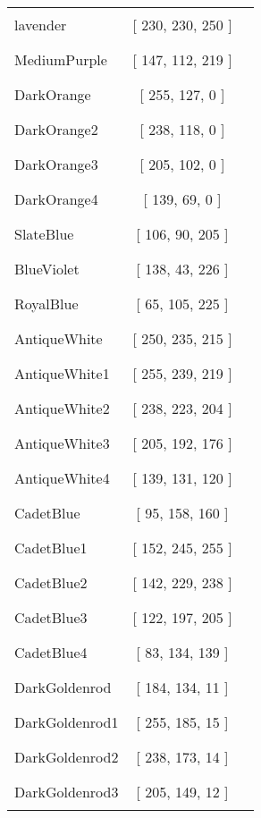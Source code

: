 \begin{tabular}{|l|c|c|}
lavender & [ 230, 230, 250 ] & \color{lavender} \rule{1cm}{1.5ex}\\
MediumPurple & [ 147, 112, 219 ] & \color{MediumPurple} \rule{1cm}{1.5ex}\\
DarkOrange & [ 255, 127, 0 ] & \color{DarkOrange} \rule{1cm}{1.5ex}\\
DarkOrange2 & [ 238, 118, 0 ] & \color{DarkOrange2} \rule{1cm}{1.5ex}\\
DarkOrange3 & [ 205, 102, 0 ] & \color{DarkOrange3} \rule{1cm}{1.5ex}\\
DarkOrange4 & [ 139, 69, 0 ] & \color{DarkOrange4} \rule{1cm}{1.5ex}\\
SlateBlue & [ 106, 90, 205 ] & \color{SlateBlue} \rule{1cm}{1.5ex}\\
BlueViolet & [ 138, 43, 226 ] & \color{BlueViolet} \rule{1cm}{1.5ex}\\
RoyalBlue & [ 65, 105, 225 ] & \color{RoyalBlue} \rule{1cm}{1.5ex}\\
AntiqueWhite & [ 250, 235, 215 ] & \color{AntiqueWhite} \rule{1cm}{1.5ex}\\
AntiqueWhite1 & [ 255, 239, 219 ] & \color{AntiqueWhite1} \rule{1cm}{1.5ex}\\
AntiqueWhite2 & [ 238, 223, 204 ] & \color{AntiqueWhite2} \rule{1cm}{1.5ex}\\
AntiqueWhite3 & [ 205, 192, 176 ] & \color{AntiqueWhite3} \rule{1cm}{1.5ex}\\
AntiqueWhite4 & [ 139, 131, 120 ] & \color{AntiqueWhite4} \rule{1cm}{1.5ex}\\
CadetBlue & [ 95, 158, 160 ] & \color{CadetBlue} \rule{1cm}{1.5ex}\\
CadetBlue1 & [ 152, 245, 255 ] & \color{CadetBlue1} \rule{1cm}{1.5ex}\\
CadetBlue2 & [ 142, 229, 238 ] & \color{CadetBlue2} \rule{1cm}{1.5ex}\\
CadetBlue3 & [ 122, 197, 205 ] & \color{CadetBlue3} \rule{1cm}{1.5ex}\\
CadetBlue4 & [ 83, 134, 139 ] & \color{CadetBlue4} \rule{1cm}{1.5ex}\\
DarkGoldenrod & [ 184, 134, 11 ] & \color{DarkGoldenrod} \rule{1cm}{1.5ex}\\
DarkGoldenrod1 & [ 255, 185, 15 ] & \color{DarkGoldenrod1} \rule{1cm}{1.5ex}\\
DarkGoldenrod2 & [ 238, 173, 14 ] & \color{DarkGoldenrod2} \rule{1cm}{1.5ex}\\
DarkGoldenrod3 & [ 205, 149, 12 ] & \color{DarkGoldenrod3} \rule{1cm}{1.5ex}\\

\end{tabular}
